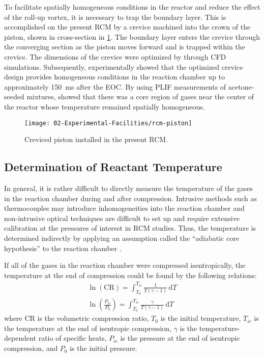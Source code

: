 \documentclass[../main.tex]{subfiles}
\begin{document}
To facilitate spatially homogeneous conditions in the reactor
and reduce the effect of the roll-up vortex, it is necessary to trap
the boundary layer. This is accomplished on the present RCM by a
crevice machined into the crown of the piston, shown in cross-section
in \cref{fig:rcm-piston}. The boundary layer enters the crevice through
the converging section as the piston moves forward and is trapped
within the crevice. The dimensions of the crevice were optimized
by \textcite{Mittal2006a} through CFD simulations. Subsequently,
\textcite{Mittal2006b} experimentally showed that the optimized crevice
design provides homogeneous conditions in the reaction chamber up to
approximately \SI{150}{\milli\second} after the EOC. By using PLIF
measurements of acetone-seeded mixtures, \textcite{Mittal2006b}
showed that there was a core region of gases near the center of the
reactor whose temperature remained spatially homogeneous.

\begin{figure}[!ht]
    \texttt{[image: 02-Experimental-Facilities/rcm-piston]}
    \caption{Creviced piston installed in the present RCM.}
    \label{fig:rcm-piston}
\end{figure}

\subsection{Determination of Reactant Temperature}

In general, it is rather difficult to directly measure the temperature
of the gases in the reaction chamber during and after compression.
Intrusive methods such as thermocouples may introduce inhomogeneities into
the reaction chamber and non-intrusive optical techniques are difficult to set up
and require extensive calibration at the pressures of interest in RCM
studies. Thus, the temperature is determined indirectly by applying an
assumption called the ``adiabatic core hypothesis'' to the reaction chamber
\cite{Mittal2007, Lee1998}.

If all of the gases in the reaction chamber were compressed isentropically,
the temperature at the end of compression could be found by the
following relations:
%
\begin{subequations}
\label{eq:tic}
\begin{align}
\ln\left(\text{CR}\right) = \int_{T_0}^{T_{ic}} \! \frac{1}{T\left(\gamma-1\right)} \, \mathrm{d} T \\
\ln\left(\frac{P_{ic}}{P_0}\right) = \int_{T_0}^{T_{ic}} \! \frac{\gamma}{T\left(\gamma-1\right)} \, \mathrm{d} T
\end{align}
\end{subequations}
%
where CR is the volumetric compression ratio, $T_0$ is the initial temperature,
$T_{ic}$ is the temperature at the end of isentropic compression, $\gamma$ is the
temperature-dependent ratio of specific heats, $P_{ic}$ is the pressure at the
end of isentropic compression, and $P_0$ is the initial pressure.
\end{document}
